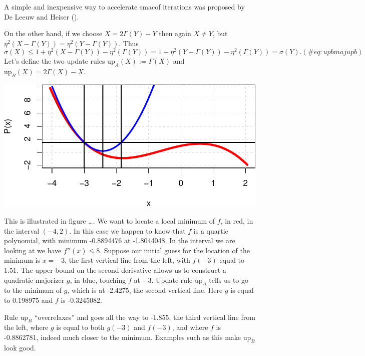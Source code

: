 \documentclass[
  12pt,
  letterpaper,
  DIV=11,
  numbers=noendperiod]{scrreprt}
\theoremstyle{remark}
\begin{document}
A simple and inexpensive way to accelerate smacof iterations was
proposed by\\
De Leeuw and Heiser ().

On the other hand, if we choose \(X=2\Gamma(Y)-Y\) then again
\(X\not= Y\), but \(\eta^2(X-\Gamma(Y))=\eta^2(Y-\Gamma(Y))\). Thus
\begin{equation}
\sigma(X)\leq 1+\eta^2(X-\Gamma(Y))-\eta^2(\Gamma(Y))=
1+\eta^2(Y-\Gamma(Y))-\eta^2(\Gamma(Y))=\sigma(Y).
(\#eq:upbmajupb)
\end{equation} Let's define the two update rules
\(\text{up}_A(X):=\Gamma(X)\) and \(\text{up}_B(X)=2\Gamma(X)-X\).

\includegraphics{acceleration_files/figure-pdf/updtstrategy-1.pdf}

This is illustrated in figure \ldots. We want to locate a local minimum
of \(f\), in red, in the interval \((-4,2)\). In this case we happen to
know that \(f\) is a quartic polynomial, with minimum -0.8894476 at
-1.8044048. In the interval we are looking at we have \(f''(x)\leq 8\).
Suppose our initial guess for the location of the minimum is \(x=-3\),
the first vertical line from the left, with \(f(-3)\) equal to 1.51. The
upper bound on the second derivative allows us to construct a quadratic
majorizer \(g\), in blue, touching \(f\) at \(-3\). Update rule
\(\text{up}_A\) tells us to go to the minimum of \(g\), which is at
-2.4275, the second vertical line. Here \(g\) is equal to 0.198975 and
\(f\) is -0.3245082.

Rule \(\text{up}_B\) ``overrelaxes'' and goes all the way to -1.855, the
third vertical line from the left, where \(g\) is equal to both
\(g(-3)\) and \(f(-3)\), and where \(f\) is -0.8862781, indeed much
closer to the minimum. Examples such as this make \(\text{up}_B\) look
good.
\end{document}
